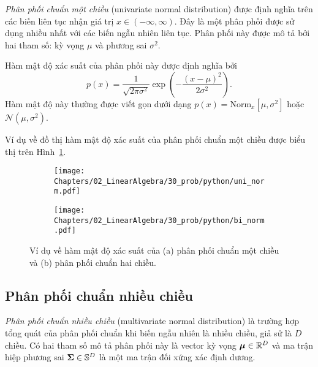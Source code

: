 \textit{Phân phối chuẩn một chiều} (univariate normal distribution) được định nghĩa trên các biến liên tục nhận giá
trị $x \in (-\infty, \infty)$. Đây là một phân phối được sử dụng nhiều nhất với
các biến ngẫu nhiên liên tục. Phân phối này được mô tả bởi hai tham số:
{kỳ vọng} $\mu$ và {phương sai} $\sigma^2$.

Hàm mật độ xác suất của phân phối này được định nghĩa bởi
\begin{equation}
\label{eqn:30_32}
p(x) = \frac{1}{\sqrt{2\pi \sigma^2}}\exp \left( -\frac{(x - \mu)^2}{2\sigma^2}\right).
\end{equation}
Hàm mật độ này thường được viết gọn dưới dạng $p(x) = \text{Norm}_x [\mu,
\sigma^2]$ hoặc $\mathcal{N}(\mu, \sigma^2)$.

Ví dụ về đồ thị hàm mật độ xác suất của phân phối chuẩn một chiều được biểu thị
trên Hình~\ref{fig:30_2a}.

\begin{figure}[t]
\begin{subfigure}{0.49\textwidth}
\texttt{[image: Chapters/02\_LinearAlgebra/30\_prob/python/uni\_norm.pdf]}
\caption{}
\label{fig:30_2a}
\end{subfigure}
\begin{subfigure}{0.49\textwidth}
\texttt{[image: Chapters/02\_LinearAlgebra/30\_prob/python/bi\_norm.pdf]}
\caption{}
\label{fig:30_2b}
\end{subfigure}
\caption{
Ví dụ về hàm mật độ xác suất của (a) phân phối chuẩn một chiều và (b) phân
phối chuẩn hai chiều.}
\label{fig:30_2}
\end{figure}

\subsection{Phân phối chuẩn nhiều chiều}

\textit{Phân phối chuẩn nhiều chiều} (multivariate normal distribution) là trường hợp tổng quát của phân phối chuẩn khi biến
ngẫu nhiên là nhiều chiều, giả sử là $D$ chiều. Có hai tham số mô tả phân phối
này là {vector kỳ vọng} $\boldsymbol{\mu} \in \mathbb{R}^D$ và {ma trận hiệp phương sai}
$\mathbf{\Sigma} \in \mathbb{S}^D$ là một ma trận {đối xứng xác định dương}.

